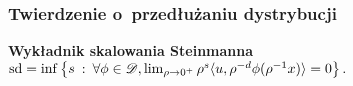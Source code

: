 \documentclass[10pt,t]{beamer}
\begin{document}
\begin{frame}
  \frametitle{Twierdzenie o~przedłużaniu dystrybucji}


  \textbf{Wykładnik skalowania Steinmanna} \\
  $\operatorname{sd} =
  \inf \left\{ s \: : \: \forall \phi \in \mathcal{D},
      \lim_{ \rho \to 0^{ + } } \rho^{ s } \langle u, \rho^{ -d } \phi( \rho^{ -1 } x ) \rangle = 0 \right\}.$













\end{frame}









\end{document}
